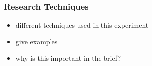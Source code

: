 \subsubsection{Research Techniques}

\begin{itemize}
	\item different techniques used in this experiment
	\item give examples
	\item why is this important in the brief?
\end{itemize}